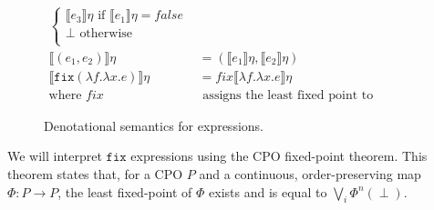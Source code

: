 \begin{figure}
\begin{align*}
\begin{cases}
      \llbracket e_3 \rrbracket\eta \text{ if } \llbracket e_1 \rrbracket\eta = false \\
      \perp \text{      otherwise} \\
   \end{cases}
  \\
  \llbracket (e_1,e_2) \rrbracket\eta &= (\llbracket e_1 \rrbracket\eta,\llbracket e_2 \rrbracket\eta) \\
   \llbracket  \texttt{fix} (\lambda f.\lambda x.e) \rrbracket\eta &= fix\llbracket \lambda f.\lambda x.e \rrbracket\eta \\
 \text{where } fix &\text{ assigns the least fixed point to continuous functions} 
 \end{align*}
 \caption{Denotational semantics for expressions.}
 \end{figure}
 
 We will interpret $\texttt{fix}$ expressions using the CPO fixed-point theorem. This theorem states that, for a CPO $P$ and a continuous, order-preserving map $\Phi : P \rightarrow P$, the least fixed-point of $\Phi$ exists and is equal to $\bigvee_i \Phi^n(\perp)$.


